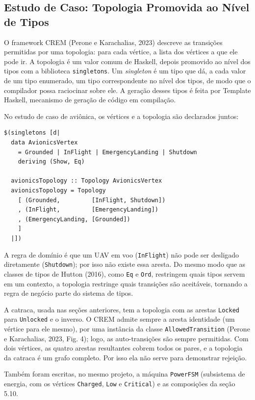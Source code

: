\documentclass[12pt,a4paper]{article}
\begin{document}
\subsection{Estudo de Caso: Topologia Promovida ao Nível de Tipos}

O framework CREM (Perone e Karachalias, 2023) descreve as transições permitidas por uma topologia: para cada vértice, a lista dos vértices a que ele pode ir. A topologia é um valor comum de Haskell, depois promovido ao nível dos tipos com a biblioteca \texttt{singletons}. Um \textit{singleton} é um tipo que dá, a cada valor de um tipo enumerado, um tipo correspondente no nível dos tipos, de modo que o compilador possa raciocinar sobre ele. A geração desses tipos é feita por Template Haskell, mecanismo de geração de código em compilação.

No estudo de caso de aviônica, os vértices e a topologia são declarados juntos:

\begin{verbatim}
$(singletons [d|
  data AvionicsVertex
    = Grounded | InFlight | EmergencyLanding | Shutdown
    deriving (Show, Eq)

  avionicsTopology :: Topology AvionicsVertex
  avionicsTopology = Topology
    [ (Grounded,         [InFlight, Shutdown])
    , (InFlight,         [EmergencyLanding])
    , (EmergencyLanding, [Grounded])
    ]
  |])
\end{verbatim}

A regra de domínio é que um UAV em voo (\texttt{InFlight}) não pode ser desligado diretamente (\texttt{Shutdown}); por isso não existe essa aresta. Do mesmo modo que as classes de tipos de Hutton (2016), como \texttt{Eq} e \texttt{Ord}, restringem quais tipos servem em um contexto, a topologia restringe quais transições são aceitáveis, tornando a regra de negócio parte do sistema de tipos.

A catraca, usada nas seções anteriores, tem a topologia com as arestas \texttt{Locked} para \texttt{Unlocked} e o inverso. O CREM admite sempre a aresta identidade (um vértice para ele mesmo), por uma instância da classe \texttt{AllowedTransition} (Perone e Karachalias, 2023, Fig. 4); logo, as auto-transições são sempre permitidas. Com dois vértices, as quatro arestas resultantes cobrem todos os pares, e a topologia da catraca é um grafo completo. Por isso ela não serve para demonstrar rejeição.

Também foram escritas, no mesmo projeto, a máquina \texttt{PowerFSM} (subsistema de energia, com os vértices \texttt{Charged}, \texttt{Low} e \texttt{Critical}) e as composições da seção 5.10.
\end{document}
